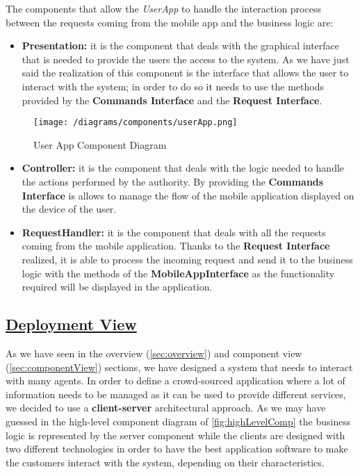 			The components that allow the \emph{UserApp} to handle the interaction process between the requests coming from the mobile app and the business logic are:
			
			\begin{itemize}
				\item \textbf{Presentation:} it is the component that deals with the graphical interface that is needed to provide the users the access to the system. As we have just said the realization of this component is the interface that allows the user to interact with the system; in order to do so it needs to use the methods provided by the \textbf{Commands Interface} and the \textbf{Request Interface}.
			\end{itemize}
			
			\begin{figure}[ht]
				\centering
				\texttt{[image: /diagrams/components/userApp.png]}
				\caption{\label{fig:userAppComp} User App Component Diagram}
			\end{figure}
		
			\begin{itemize}
				\item \textbf{Controller:} it is the component that deals with the logic needed to handle the actions performed by the authority. By providing the \textbf{Commands Interface} is allows to manage the flow of the mobile application displayed on the device of the user.
				
				\item \textbf{RequestHandler:} it is the component that deals with all the requests coming from the mobile application. Thanks to the \textbf{Request Interface} realized, it is able to process the incoming request and send it to the business logic with the methods of the \textbf{MobileAppInterface} as the functionality required will be displayed in the application.
			\end{itemize}
			
	\subsection[Deployment View]{\hyperlink{toc}{Deployment View}}
		\label{sec:deploymentView}

		As we have seen in the overview (\ref{sec:overview}) and component view (\ref{sec:componentView}) sections, we have designed a system that needs to interact with many agents. In order to define a crowd-sourced application where a lot of information needs to be managed as it can be used to provide different services, we decided to use a \textbf{client-server} architectural approach. As we may have guessed in the high-level component diagram of \autoref{fig:highLevelComp} the business logic is represented by the server component while the clients are designed with two different technologies in order to have the best application software to make the customers interact with the system, depending on their characteristics.\\
		
